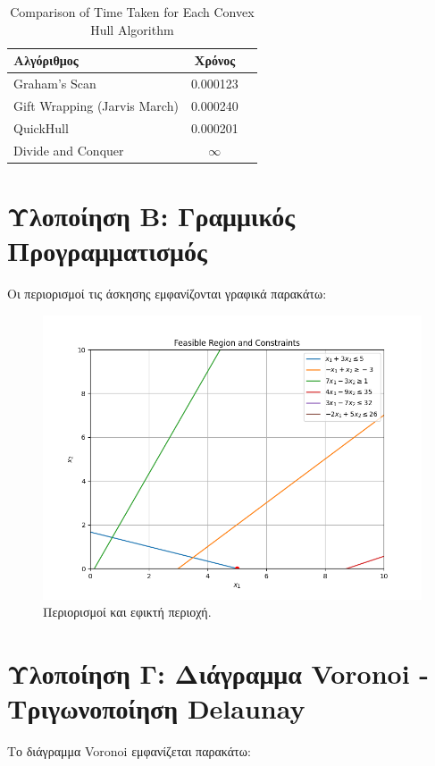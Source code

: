 \documentclass[11pt, oneside]{article}   	%
\begin{document}
\begin{table}[ht]
	\centering
	\begin{tabular}{@{}lcc@{}}
		\toprule
		\textbf{Αλγόριθμος}            & \textbf{Χρόνος} \\ \midrule
		Graham's Scan                 & 0.000123                \\
		Gift Wrapping (Jarvis March)   & 0.000240                \\
		QuickHull                     & 0.000201                \\
		Divide and Conquer            & $\infty$                \\ \bottomrule
	\end{tabular}
	\caption{Comparison of Time Taken for Each Convex Hull Algorithm}
	\label{tab:convex-hull-times}
\end{table}

\section{Υλοποίηση Β: Γραμμικός Προγραμματισμός}

Οι περιορισμοί τις άσκησης εμφανίζονται γραφικά παρακάτω:

\begin{figure}[h!]
	\centering
	\includegraphics[width=0.7\linewidth]{Figure_2}
	\caption{Περιορισμοί και εφικτή περιοχή.}
	\label{fig:figure2}
\end{figure}

\section{Υλοποίηση Γ: Διάγραμμα Voronoi - Τριγωνοποίηση Delaunay}

Το διάγραμμα Voronoi εμφανίζεται παρακάτω:
\end{document}
